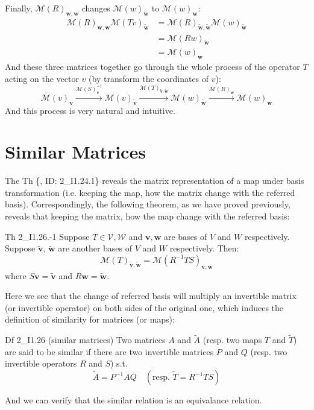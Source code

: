 \documentclass{article}
\newcommand{\basisTilde}[1]{\tilde{\pmb{#1}}}
\begin{document}
Finally, $\mathcal{M}(R)_{\pmb{w}, \pmb{w}}$ changes $\mathcal{M}(w)_{\basisTilde{w}}$ to $\mathcal{M}(w)_{\pmb{w}}$:
$$
\begin{aligned}
    \mathcal{M}(R)_{\pmb{w}, \pmb{w}}\mathcal{M}(Tv)_{\basisTilde{w}} &= \mathcal{M}(R)_{\basisTilde{w}, \basisTilde{w}}\mathcal{M}(w)_{\basisTilde{w}} \\
    &= \mathcal{M}(Rw)_{\basisTilde{w}} \\
    &= \mathcal{M}(w)_{\pmb{w}}
\end{aligned}
$$
And these three matrices together go through the whole process of the operator $T$ acting on the vector $v$ (by transform the coordinates of $v$):
$$\mathcal{M}(v)_{\pmb{v}}\overset{\mathcal{M}(S)^{-1}_{\pmb{v}}}{\longrightarrow}\mathcal{M}(v)_{\basisTilde{v}}\overset{\mathcal{M}(T)_{\basisTilde{v}, \basisTilde{w}}}{\longrightarrow}\mathcal{M}(w)_{\basisTilde{w}}\overset{\mathcal{M}(R)_{\pmb{w}}}{\longrightarrow}\mathcal{M}(w)_{\pmb{w}}$$
And this process is very natural and intuitive.

\section{Similar Matrices}
The Th \{, ID: 2\_I1.24.1\} reveals the matrix representation of a map under basis transformation (i.e. keeping the map, how the matrix change with the referred basis). Correspondingly, the following theorem, as we have proved previously, reveals that keeping the matrix, how the map change with the referred basis:
\begin{Th}{Th 2\_I1.26.-1}
    Suppose $T\in\mathcal{V, W}$ and $\pmb{v}, \pmb{w}$ are bases of $V$ and $W$ respectively. Suppose $\basisTilde{v}$, $\basisTilde{w}$ are another bases of $V$ and $W$ respectively. Then:
    $$\mathcal{M}(T)_{\basisTilde{v}, \basisTilde{w}} = \mathcal{M}(R^{-1}TS)_{\pmb{v}, \pmb{w}}$$
    where $S\pmb{v} = \basisTilde{v}$ and $R\pmb{w} = \basisTilde{w}$.
\end{Th}

Here we see that the change of referred basis will multiply an invertible matrix (or invertible operator) on both sides of the original one, which induces the definition of similarity for matrices (or maps):
\begin{Df}{Df 2\_I1.26 (similar matrices)}
    Two matrices $A$ and $\tilde{A}$ (resp. two maps $T$ and $\tilde{T}$) are said to be similar if there are two invertible matrices $P$ and $Q$ (resp. two invertible operators $R$ and $S$) s.t.
    $$ \tilde{A} = P^{-1}AQ \quad(\text{resp. } \tilde{T} = R^{-1}TS) $$
\end{Df}

And we can verify that \textcolor{Th}{the similar relation is an equivalance relation.}
\end{document}
